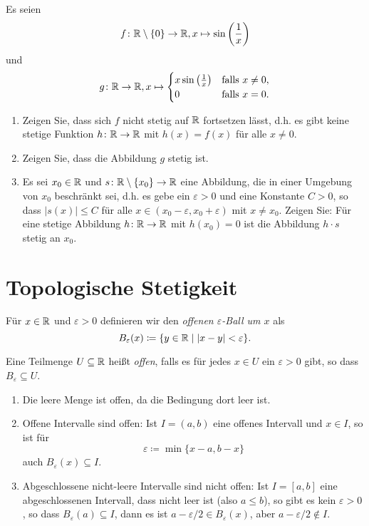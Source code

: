 \documentclass[a4paper,10pt]{article}
\begin{document}
\begin{question}
 Es seien
 \[
  f \colon \mathbb{R} \setminus \{0\} \to \mathbb{R}, x \mapsto \sin\left(\frac{1}{x}\right)
 \]
 und
  \[
  g \colon \mathbb{R} \to \mathbb{R},
  x \mapsto
  \begin{cases}
   x \sin\left(\frac{1}{x}\right) & \text{falls $x \neq 0$}, \\
                                0 & \text{falls $x = 0$}.
  \end{cases}
 \]
 \begin{enumerate}
  \item
   Zeigen Sie, dass sich $f$ nicht stetig auf $\mathbb{R}$ fortsetzen lässt, d.h. es gibt keine stetige Funktion $h \colon \mathbb{R} \to \mathbb{R}$ mit $h(x) = f(x)$ für alle $x \neq 0$.
  \item
   Zeigen Sie, dass die Abbildung $g$ stetig ist.
  \item
   Es sei $x_0 \in \mathbb{R}$ und $s \colon \mathbb{R} \setminus\{x_0\} \to \mathbb{R}$ eine Abbildung, die in einer Umgebung von $x_0$ beschränkt sei, d.h. es gebe ein $\varepsilon > 0$ und eine Konstante $C > 0$, so dass $|s(x)| \leq C$ für alle $x \in (x_0 - \varepsilon, x_0 + \varepsilon)$ mit $x \neq x_0$. Zeigen Sie: Für eine stetige Abbildung $h \colon \mathbb{R} \to \mathbb{R}$ mit $h(x_0) = 0$ ist die Abbildung $h \cdot s$ stetig an $x_0$.
 \end{enumerate}
\end{question}





\section{Topologische Stetigkeit}


\begin{defi}
 Für $x \in \mathbb{R}$ und $\varepsilon > 0$ definieren wir den \emph{offenen $\varepsilon$-Ball um $x$} als
 \[
  B_\varepsilon(x) \coloneqq \{y \in \mathbb{R} \mid |x-y| < \varepsilon\}.
 \]
\end{defi}


\begin{defi}
 Eine Teilmenge $U \subseteq \mathbb{R}$ heißt \emph{offen}, falls es für jedes $x \in U$ ein $\varepsilon > 0$ gibt, so dass $B_\varepsilon \subseteq U$.
\end{defi}


\begin{bsp}
 \begin{enumerate}
  \item
   Die leere Menge ist offen, da die Bedingung dort leer ist.
  \item
   Offene Intervalle sind offen: Ist $I = (a,b)$ eine offenes Intervall und $x \in I$, so ist für
   \[
    \varepsilon \coloneqq \min\{x-a, b-x\}
   \]
   auch $B_\varepsilon(x) \subseteq I$.
  \item
   Abgeschlossene nicht-leere Intervalle sind nicht offen: Ist $I = [a,b]$ eine abgeschlossenen Intervall, dass nicht leer ist (also $a \leq b$), so gibt es kein $\varepsilon > 0$, so dass $B_\varepsilon(a) \subseteq I$, dann es ist $a-\varepsilon/2 \in B_\varepsilon(x)$, aber $a-\varepsilon/2 \notin I$.
 \end{enumerate}
\end{bsp}
\end{document}
